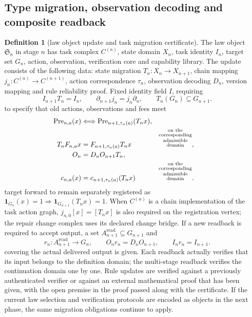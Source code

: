 \documentclass[12pt,a4paper,openany,notitlepage]{report}
\theoremstyle{plain}
\theoremstyle{definition}
\newtheorem{definition}[theorem]{Definition}
\theoremstyle{remark}
\def\mathcal#1{#1}\def\mathsf#1{#1}\def\mathbb#1{#1}%
\begin{document}
\begin{CJK*}
\section { Type migration, observation decoding and composite readback }\label{exp:gov:migration-section}


\begin{definition}
[law object update and task migration certificate]\label{hgov:def:migration}
The law object $\mathfrak S_n$ in stage $n$ has task complex $C^{(n)}$, state domain $X_n$, task identity $I_n$, target set $G_n$, action, observation, verification core and capability library. The update consists of the following data: state migration $T_n:X_n\to X_{n+1}$, chain mapping $j_n:C^{(n)}\to C^{(n+1)}$, action correspondence $\tau_n$, observation decoding $D_n$, version mapping and rule reliability proof. Fixed identity field $\mathcal I$, requiring \[
I_{n+1}T_n=I_n,\qquad
\partial_{n+1}j_n=j_n\partial_n,\qquad
T_n(G_n)\subseteq G_{n+1}.
\] to specify that old actions, observations and fees meet \[
\begin{aligned}
 \operatorname{Pre}_{n,a}(x)
 &\Longleftrightarrow
 \operatorname{Pre}_{n+1,\tau_n(a)}(T_nx),\\
 T_nF_{n,a}x&=F_{n+1,\tau_n(a)}T_nx
 &&\text{\shortstack[c]{\scriptsize on the\\[-1pt]\scriptsize corresponding\\[-1pt]\scriptsize admissible\\[-1pt]\scriptsize domain}},\\
 O_n&=D_nO_{n+1}T_n,\\
 c_{n,a}(x)&=c_{n+1,\tau_n(a)}(T_nx)
 &&\text{\shortstack[c]{\scriptsize on the\\[-1pt]\scriptsize corresponding\\[-1pt]\scriptsize admissible\\[-1pt]\scriptsize domain}}.
\end{aligned}
\] target forward to remain separately registered as $\mathbf1_{G_n}(x)=1\Rightarrow\mathbf1_{G_{n+1}}(T_nx)=1$. When $C^{(n)}$ is a chain implementation of the task action graph, $j_{n,0}[x]=[T_nx]$ is also required on the registration vertex; the repair change complex uses its declared change bridge. If a new readback is required to accept output, a set $\mathcal A_{n+1}^{\mathrm{read}}\subseteq G_{n+1}$ and \[
 r_n:\mathcal A_{n+1}^{\mathrm{read}}\longrightarrow G_n,\qquad
 O_nr_n=D_nO_{n+1},\qquad I_nr_n=I_{n+1}.
\] covering the actual delivered output is given. Each readback actually verifies that its input belongs to the definition domain; the multi-stage readback verifies the continuation domain one by one. Rule updates are verified against a previously authenticated verifier or against an external mathematical proof that has been given, with the open premise in the proof passed along with the certificate. If the current law selection and verification protocols are encoded as objects in the next phase, the same migration obligations continue to apply.\end{definition}



\end{CJK*}
\end{document}
